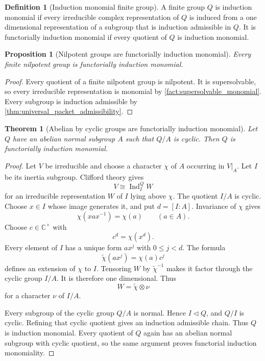 \documentclass{aomart}
\newtheorem{theorem}{Theorem}[section]
\newtheorem{proposition}[proposition]{Proposition}
\theoremstyle{definition}
\newtheorem{definition}[definition]{Definition}
\theoremstyle{remark}
\newcommand{\CC}{\mathbb C}
\newcommand{\Ind}{\operatorname{Ind}}
\begin{document}
\begin{definition}[Induction monomial finite group]\label{def:induction_monomial_group}
A finite group \(Q\) is induction monomial if every irreducible complex representation of \(Q\) is induced from a one dimensional representation of a subgroup that is induction admissible in \(Q\). It is functorially induction monomial if every quotient of \(Q\) is induction monomial.
\end{definition}

\begin{proposition}[Nilpotent groups are functorially induction monomial]\label{prop:nilpotent_induction_monomial}
Every finite nilpotent group is functorially induction monomial.
\end{proposition}

\begin{proof}
Every quotient of a finite nilpotent group is nilpotent. It is supersolvable, so every irreducible representation is monomial by \cref{fact:supersolvable_monomial}. Every subgroup is induction admissible by \cref{thm:universal_packet_admissibility}.
\end{proof}

\begin{theorem}[Abelian by cyclic groups are functorially induction monomial]\label{thm:abelian_cyclic_induction_monomial}
Let \(Q\) have an abelian normal subgroup \(A\) such that \(Q/A\) is cyclic. Then \(Q\) is functorially induction monomial.
\end{theorem}

\begin{proof}
Let \(V\) be irreducible and choose a character \(\chi\) of \(A\) occurring in \(V|_A\). Let \(I\) be its inertia subgroup. Clifford theory gives
\[
V\cong\Ind_I^QW
\]
for an irreducible representation \(W\) of \(I\) lying above \(\chi\). The quotient \(I/A\) is cyclic. Choose \(x\in I\) whose image generates it, and put \(d=[I:A]\). Invariance of \(\chi\) gives
\[
\chi(xax^{-1})=\chi(a)
\qquad(a\in A).
\]
Choose \(c\in\CC^\times\) with
\[
c^d=\chi(x^d).
\]
Every element of \(I\) has a unique form \(ax^j\) with \(0\leq j<d\). The formula
\[
\widetilde\chi(ax^j)=\chi(a)c^j
\]
defines an extension of \(\chi\) to \(I\). Tensoring \(W\) by \(\widetilde\chi^{-1}\) makes it factor through the cyclic group \(I/A\). It is therefore one dimensional. Thus
\[
W=\widetilde\chi\otimes\nu
\]
for a character \(\nu\) of \(I/A\).

Every subgroup of the cyclic group \(Q/A\) is normal. Hence \(I\triangleleft Q\), and \(Q/I\) is cyclic. Refining that cyclic quotient gives an induction admissible chain. Thus \(Q\) is induction monomial. Every quotient of \(Q\) again has an abelian normal subgroup with cyclic quotient, so the same argument proves functorial induction monomiality.
\end{proof}
\end{document}
